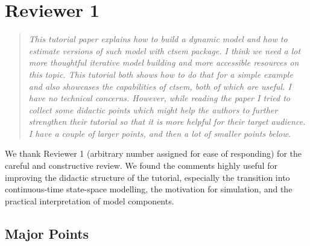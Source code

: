 \documentclass[11pt]{article}
\newenvironment{reviewerpoint}{\begin{quote}\itshape}{\end{quote}}
\begin{document}
\section*{Reviewer 1}

\begin{reviewerpoint}
This tutorial paper explains how to build a dynamic model and how to estimate versions of such model with ctsem package.
I think we need a lot more thoughtful iterative model building and more accessible resources on this topic.
This tutorial both shows how to do that for a simple example and also showcases the capabilities of ctsem, both of which are useful.
I have no technical concerns.
However, while reading the paper I tried to collect some didactic points which might help the authors to further strengthen their tutorial so that it is more helpful for their target audience.
I have a couple of larger points, and then a lot of smaller points below.
\end{reviewerpoint}
We thank Reviewer 1 (arbitrary number assigned for ease of responding) for the careful and constructive review.
We found the comments highly useful for improving the didactic structure of the tutorial, especially the transition into continuous-time state-space modelling, the motivation for simulation, and the practical interpretation of model components.

\subsection*{Major Points}
\end{document}
